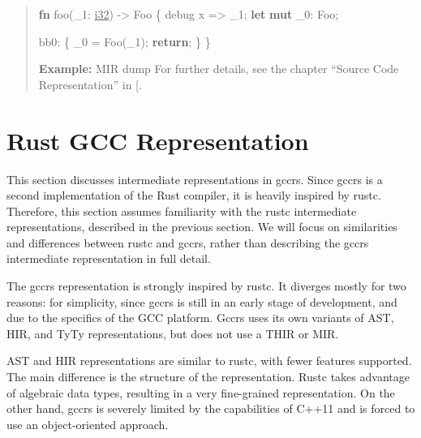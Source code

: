 \documentclass[
  11pt,
  twoside]{report}
\newenvironment{Shaded}{}{}
\newcommand{\ControlFlowTok}[1]{\textbf{#1}}
\newcommand{\DataTypeTok}[1]{\underline{#1}}
\newcommand{\KeywordTok}[1]{\textbf{#1}}
\newcommand{\NormalTok}[1]{#1}
\newcommand{\OperatorTok}[1]{#1}
\begin{document}
\begin{quote}
\begin{Shaded}
\begin{Highlighting}[]
\KeywordTok{fn}\NormalTok{ foo(\_1}\OperatorTok{:} \DataTypeTok{i32}\NormalTok{) }\OperatorTok{{-}\textgreater{}}\NormalTok{ Foo }\OperatorTok{\{}
\NormalTok{    debug x }\OperatorTok{=\textgreater{}}\NormalTok{ \_1}\OperatorTok{;}
    \KeywordTok{let} \KeywordTok{mut}\NormalTok{ \_0}\OperatorTok{:}\NormalTok{ Foo}\OperatorTok{;}

\NormalTok{    bb0}\OperatorTok{:} \OperatorTok{\{}
\NormalTok{        \_0 }\OperatorTok{=}\NormalTok{ Foo(\_1)}\OperatorTok{;}
        \ControlFlowTok{return}\OperatorTok{;}
    \OperatorTok{\}}
\OperatorTok{\}}
\end{Highlighting}
\end{Shaded}

\textbf{Example:} MIR dump For further details, see the chapter ``Source
Code Representation'' in {[}\citeproc{ref-devguide}{13}{]}.
\end{quote}

\section{Rust GCC Representation}\label{sec:rust-gcc-representation}

This section discusses intermediate representations in gccrs. Since
gccrs is a second implementation of the Rust compiler, it is heavily
inspired by rustc. Therefore, this section assumes familiarity with the
rustc intermediate representations, described in the previous section.
We will focus on similarities and differences between rustc and gccrs,
rather than describing the gccrs intermediate representation in full
detail.

The gccrs representation is strongly inspired by rustc. It diverges
mostly for two reasons: for simplicity, since gccrs is still in an early
stage of development, and due to the specifics of the GCC platform.
Gccrs uses its own variants of AST, HIR, and TyTy representations, but
does not use a THIR or MIR.

AST and HIR representations are similar to rustc, with fewer features
supported. The main difference is the structure of the representation.
Rustc takes advantage of algebraic data types, resulting in a very
fine-grained representation. On the other hand, gccrs is severely
limited by the capabilities of C++11 and is forced to use an
object-oriented approach.
\end{document}
